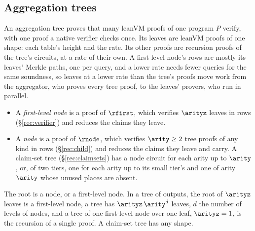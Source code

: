 \subsection{Aggregation trees}\label{rec:tree}

An aggregation tree proves that many leanVM proofs of one program $P$ verify, with one proof a native verifier checks once. Its leaves are leanVM proofs of one shape: each table's height and the rate. Its other proofs are recursion proofs of the tree's circuits, at a rate of their own. A first-level node's rows are mostly its leaves' Merkle paths, one per query, and a lower rate needs fewer queries for the same soundness, so leaves at a lower rate than the tree's proofs move work from the aggregator, who proves every tree proof, to the leaves' provers, who run in parallel.
\begin{itemize}[itemsep=1pt,topsep=3pt]
\item A \emph{first-level node} is a proof of $\rfirst$, which verifies $\arityz$ leaves in rows (\S\ref{rec:verifier}) and reduces the claims they leave.
\item A \emph{node} is a proof of $\rnode$, which verifies $\arity\ge2$ tree proofs of any kind in rows (\S\ref{rec:child}) and reduces the claims they leave and carry. A claim-set tree (\S\ref{rec:claimsets}) has a node circuit for each arity up to $\arity$, or, of two tiers, one for each arity up to its small tier's and one of arity $\arity$ whose unused places are absent.
\end{itemize}
The root is a node, or a first-level node. In a tree of outputs, the root of $\arityz$ leaves is a first-level node, a tree has $\arityz\,\arity^d$ leaves, $d$ the number of levels of nodes, and a tree of one first-level node over one leaf, $\arityz=1$, is the recursion of a single proof. A claim-set tree has any shape.

